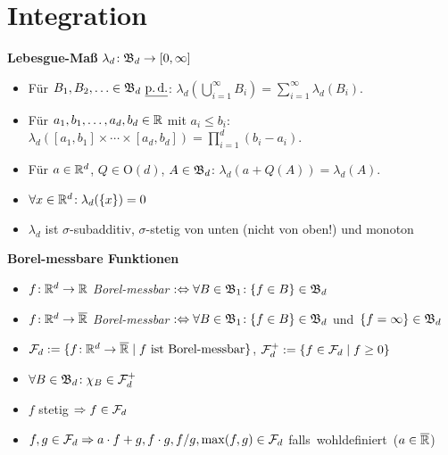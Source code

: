\section{Integration}

\textbf{Lebesgue-Maß} $\lambda_d\!: \mathfrak{B}_d \to [0,\infty]$
\begin{itemize}
\item Für $B_1,B_2,\ldots\in\B_d\ \pd$:\:
  $\lambda_d(\bigcup_{i=1}^{\infty} B_i) = \sum_{i=1}^{\infty} \lambda_d(B_i)$.

\item Für $a_1,b_1,\ldots,a_d,b_d\in\mathbb{R}$ mit $a_i \leq b_i$:\:\:
  \mbox{$\lambda_d([a_1,b_1] \times\cdots\times [a_d,b_d]) =
  \prod_{i=1}^{d} (b_i-a_i)$.}

\item Für $a\in\mathbb{R}^d$, $Q\in\mathrm{O}(d)$, $A\in\mathfrak{B}_d$:
  $\lambda_d(a+Q(A)) = \lambda_d(A)$.

\item $\forall x\in\mathbb{R}^d\!: \lambda_d(\{x\}) = 0$

\item $\lambda_d$ ist $\sigma$-subadditiv, $\sigma$-stetig von unten
  (nicht von oben!) und monoton
\end{itemize}

\textbf{Borel-messbare Funktionen}
\begin{itemize}
\item $f\!: \mathbb{R}^d\to\mathbb{R}$ \textit{Borel-messbar}
  $:\Leftrightarrow \forall B\in\mathfrak{B}_1\!: \{f \in B\} \in\mathfrak{B}_d$

\item $f\!: \mathbb{R}^d\to\overline{\mathbb{R}}$ \textit{Borel-messbar}
  $:\Leftrightarrow \forall B\in\mathfrak{B}_1\!: \{f \in B\} \in\mathfrak{B}_d$
  \mbox{und $\{f = \infty\} \in\mathfrak{B}_d$}

\item $\mathcal{F}_d := \{f\!: \mathbb{R}^d \to \overline{\mathbb{R}} \mid f \text{ ist Borel-messbar}\}$,
  $\mathcal{F}_d^+ := \{f\in\mathcal{F}_d \mid f \geq 0\}$

\item $\forall B\in\mathfrak{B}_d\!: \chi_B\in\mathcal{F}_d^+$

\item $f$ stetig $\Rightarrow f\in\mathcal{F}_d$

\item $f,g\in\mathcal{F}_d \Rightarrow a \cdot f + g, f \cdot g, f/g,
  \operatorname{max}(f,g)\in\mathcal{F}_d$ \mbox{falls wohldefiniert ($a\in\overline{\mathbb{R}}$)}
\end{itemize}

